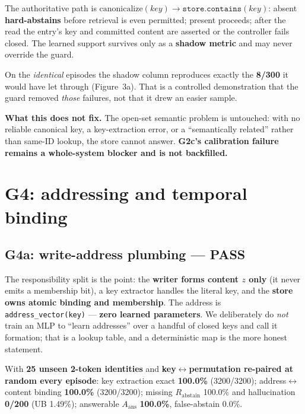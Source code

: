 \documentclass[11pt, a4paper]{article}
\newcommand{\PASS}{\textcolor{green!45!black}{\textbf{PASS}}}
\begin{document}
The authoritative path is $\text{canonicalize}(key) \to \texttt{store.contains}(key)$:
absent \textbf{hard-abstains} before retrieval is even permitted; present proceeds; after
the read the entry's key and committed content are asserted or the controller fails
closed. The learned support survives only as a \textbf{shadow metric} and may never
override the guard.

On the \emph{identical} episodes the shadow column reproduces exactly the \textbf{8/300}
it would have let through (Figure~3a). That is a controlled demonstration that the guard
removed \emph{those} failures, not that it drew an easier sample.

\textbf{What this does not fix.} The open-set semantic problem is untouched: with no
reliable canonical key, a key-extraction error, or a ``semantically related'' rather than
same-ID lookup, the store cannot answer. \textbf{G2c's calibration failure remains a
whole-system blocker and is not backfilled.}

\section{G4: addressing and temporal binding}

\subsection{G4a: write-address plumbing --- \PASS{}}

The responsibility split is the point: the \textbf{writer forms content $z$ only} (it
never emits a membership bit), a key extractor handles the literal key, and the
\textbf{store owns atomic binding and membership}. The address is
\verb|address_vector(key)| --- \textbf{zero learned parameters}. We deliberately do
\emph{not} train an MLP to ``learn addresses'' over a handful of closed keys and call it
formation; that is a lookup table, and a deterministic map is the more honest statement.

With \textbf{25 unseen 2-token identities} and \textbf{key$\leftrightarrow$permutation
re-paired at random every episode}: key extraction exact \textbf{100.0\%} (3200/3200);
address$\leftrightarrow$content binding \textbf{100.0\%} (3200/3200); missing
$R_{\mathrm{abstain}}$ 100.0\% and hallucination \textbf{0/200} (UB 1.49\%); answerable
$A_{\mathrm{ans}}$ \textbf{100.0\%}, false-abstain 0.0\%.
\end{document}
